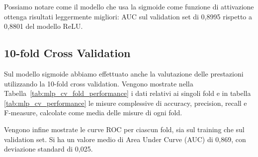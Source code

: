 Possiamo notare come il modello che usa la sigmoide come funzione di 
attivazione ottenga risultati leggermente migliori: AUC sul validation set di 
0,8995 rispetto a 0,8801 del modello ReLU. 

\subsection{10-fold Cross Validation}

Sul modello sigmoide abbiamo effettuato anche la valutazione delle prestazioni 
utilizzando la 10-fold cross validation. Vengono mostrate nella 
Tabella~\ref{tab:mlp_cv_fold_performance} i dati relativi ai singoli fold e in 
tabella \ref{tab:mlp_cv_performance} le misure complessive di accuracy, 
precision, recall e F-measure, calcolate come media delle misure di ogni fold. 

Vengono infine mostrate le curve ROC per ciascun fold, sia sul training che 
sul validation set. Si ha un valore medio di Area Under Curve (AUC) di 0,869, 
con deviazione standard di 0,025.

